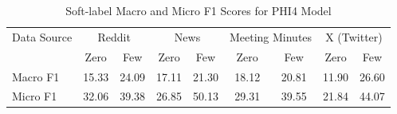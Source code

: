 \begin{table}[htbp]
\centering
\begin{tabular}{l *{8}{c}}
\toprule
Data Source & \multicolumn{2}{c}{Reddit} & \multicolumn{2}{c}{News} & \multicolumn{2}{c}{Meeting Minutes} & \multicolumn{2}{c}{X (Twitter)} \\
& Zero & Few & Zero & Few & Zero & Few & Zero & Few \\
\midrule
Macro F1 & 15.33 & 24.09 & 17.11 & 21.30 & 18.12 & 20.81 & 11.90 & 26.60 \\
Micro F1 & 32.06 & 39.38 & 26.85 & 50.13 & 29.31 & 39.55 & 21.84 & 44.07 \\
\bottomrule
\end{tabular}
\centering\caption{Soft-label Macro and Micro F1 Scores for PHI4 Model}
\label{tab:phi4_macro_micro}
\end{table}